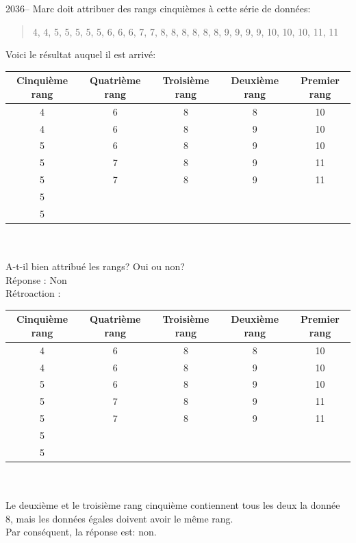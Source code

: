\documentclass[letterpaper, 12pt]{article}
\begin{document}
2036-- Marc doit attribuer des rangs cinqui\`emes \`a cette s\'erie de donn\'ees:
\begin{quote}
4, 4, 5, 5, 5, 5, 5, 6, 6, 6, 7, 7, 8, 8, 8, 8, 8, 8, 9, 9, 9, 9, 10, 10, 10, 11, 11
\end{quote}
Voici le r\'esultat auquel il est arriv\'e:\\
\begin{tabular}{| c | c | c | c | c|} \hline
{\bf Cinqui\`eme rang } & {\bf Quatri\`eme rang} & {\bf Troisi\`eme rang } & {\bf Deuxi\`eme rang} & {\bf Premier rang}\\ \hline \hline

4 & 6 & 8 & 8 & 10\\
4 & 6 & 8 & 9 & 10 \\
5 & 6 & 8 & 9 & 10 \\
5 & 7 & 8 & 9 & 11 \\
5 & 7 & 8 & 9 & 11 \\
5 &  &  &  &  \\
5 &  &  &  &  \\
\hline

\end{tabular}\\ \\
A-t-il bien attribu\'e les rangs? Oui ou non?\\

R\'eponse : Non\\

R\'etroaction :\\
\begin{tabular}{| c | c | c | c | c|} \hline
{\bf Cinqui\`eme rang } & {\bf Quatri\`eme rang} & {\bf Troisi\`eme rang } & {\bf Deuxi\`eme rang} & {\bf Premier rang}\\ \hline \hline

4 & 6 & 8 & 8 & 10\\
4 & 6 & 8 & 9 & 10 \\
5 & 6 & 8 & 9 & 10 \\
5 & 7 & 8 & 9 & 11 \\
5 & 7 & 8 & 9 & 11 \\
5 &  &  &  &  \\
5 &  &  &  &  \\
\hline

\end{tabular}\\ \\
Le deuxi\`eme et le troisi\`eme rang cinqui\`eme contiennent tous les deux la donn\'ee 8, mais les donn\'ees \'egales doivent avoir le m\^eme rang. \\
Par cons\'equent, la r\'eponse est: non.\\
\end{document}
